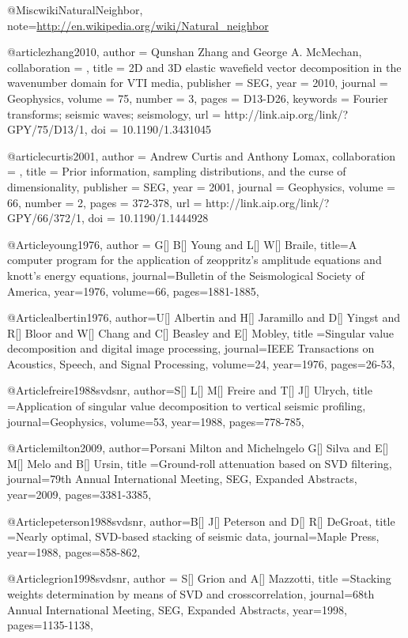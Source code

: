 @Misc{wikiNaturalNeighbor,
  note={\url{http://en.wikipedia.org/wiki/Natural_neighbor}  }
}


@article{zhang2010,
author = {Qunshan Zhang and George A. McMechan},
collaboration = {},
title = {2{D} and 3{D} elastic wavefield vector decomposition in the wavenumber domain for VTI media},
publisher = {SEG},
year = {2010},
journal = {Geophysics},
volume = {75},
number = {3},
pages = {D13-D26},
keywords = {{F}ourier transforms; seismic waves; seismology},
url = {http://link.aip.org/link/?GPY/75/D13/1},
doi = {10.1190/1.3431045}
}

@article{curtis2001,
author = {Andrew Curtis and Anthony Lomax},
collaboration = {},
title = {Prior information, sampling distributions, and the curse of dimensionality},
publisher = {SEG},
year = {2001},
journal = {Geophysics},
volume = {66},
number = {2},
pages = {372-378},
url = {http://link.aip.org/link/?GPY/66/372/1},
doi = {10.1190/1.1444928}
}

@Article{young1976,
  author = {G[] B[] Young and L[] W[] Braile},
  title={A computer program for the application of zeoppritz's amplitude equations and knott's energy equations},
  journal={Bulletin of the Seismological Society of America},
  year=1976,
  volume=66,
  pages={1881-1885},
}

@Article{albertin1976,
  author={U[] Albertin and H[] Jaramillo and D[] Yingst and R[] Bloor and W[] Chang and C[] Beasley and E[] Mobley},
  title ={Singular value decomposition and digital image processing},
  journal={IEEE Transactions on Acoustics, Speech, and Signal Processing},
  volume=24,
  year=1976,
  pages={26-53},
}

@Article{freire1988svdsnr,
  author={S[] L[] M[] Freire and T[] J[] Ulrych},
  title ={Application of singular value decomposition to vertical seismic profiling},
  journal={Geophysics},
  volume=53,
  year=1988,
  pages={778-785},
}

@Article{milton2009,
  author={Porsani Milton and Michelngelo G[] Silva and E[] M[] Melo and B[] Ursin},
  title ={Ground-roll attenuation based on SVD filtering},
  journal={79th Annual International Meeting, SEG, Expanded Abstracts},
  year=2009,
  pages={3381-3385},
}

@Article{peterson1988svdsnr,
  author={B[] J[] Peterson and D[] R[] DeGroat},
  title ={Nearly optimal, SVD-based stacking of seismic data},
  journal={Maple Press},
  year=1988,
  pages={858-862},
}

@Article{grion1998svdsnr,
  author = {S[] Grion and A[] Mazzotti},
  title ={Stacking weights determination by means of SVD and crosscorrelation},
  journal={68th Annual International Meeting, SEG, Expanded Abstracts},
  year=1998,
  pages={1135-1138},
}

